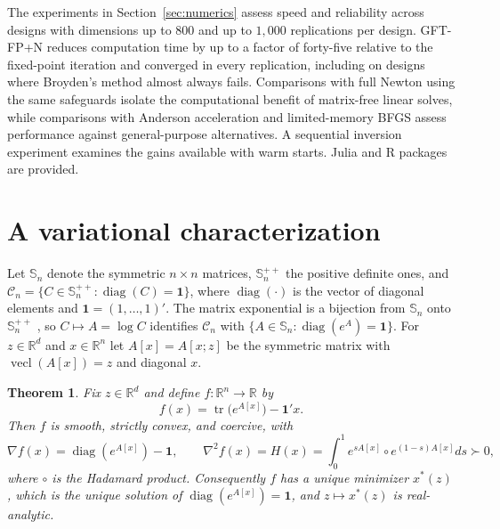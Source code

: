 \documentclass[11pt]{article}
\newcommand{\R}{\mathbb{R}}
\newcommand{\tr}{\operatorname{tr}}
\newcommand{\diag}{\operatorname{diag}}
\newcommand{\vecl}{\operatorname{vecl}}
\newcommand{\one}{\mathbf{1}}
\newcommand{\Sym}{\mathbb{S}_n}
\newcommand{\SPD}{\mathbb{S}_n^{++}}
\newcommand{\Cn}{\mathcal{C}_n}
\newtheorem{theorem}{Theorem}
\begin{document}
The experiments in Section~\ref{sec:numerics} assess speed and reliability across designs with dimensions up to $800$ and up to $1{,}000$ replications per design. GFT-FP+N reduces computation time by up to a factor of forty-five relative to the fixed-point iteration and converged in every replication, including on designs where Broyden's method almost always fails. Comparisons with full Newton using the same safeguards isolate the computational benefit of matrix-free linear solves, while comparisons with Anderson acceleration and limited-memory BFGS assess performance against general-purpose alternatives. A sequential inversion experiment examines the gains available with warm starts. Julia and R packages are provided.

\section{A variational characterization}\label{sec:var}

Let $\Sym$ denote the symmetric $n\times n$ matrices, $\SPD$ the
positive definite ones, and $\Cn=\{C\in\SPD:\diag(C)=\one\}$, where
$\diag(\cdot)$ is the vector of diagonal elements and
$\one=(1,\ldots,1)'$. The matrix exponential is a bijection from $\Sym$
onto $\SPD$ \citep[Ch.~11]{Higham:2008}, so $C\mapsto A=\log C$
identifies $\Cn$ with $\{A\in\Sym:\diag(e^{A})=\one\}$. For $z\in\R^{d}$
and $x\in\R^{n}$ let $A[x]=A[x;z]$ be the symmetric matrix with
$\vecl(A[x])=z$ and diagonal $x$.

\begin{theorem}\label{thm:var}
Fix $z\in\R^{d}$ and define $f:\R^{n}\to\R$ by
\begin{equation}\label{eq:f}
f(x)=\tr\big(e^{A[x]}\big)-\one'x .
\end{equation}
Then $f$ is smooth, strictly convex, and coercive, with
\[
\nabla f(x)=\diag(e^{A[x]})-\one,
\qquad
\nabla^{2}f(x)=H(x)=\int_{0}^{1}e^{sA[x]}\circ e^{(1-s)A[x]}ds\succ0,
\]
where $\circ$ is the Hadamard product. Consequently $f$ has a unique
minimizer $x^{\ast}(z)$, which is the unique solution of
$\diag(e^{A[x]})=\one$, and $z\mapsto x^{\ast}(z)$ is real-analytic.
\end{theorem}
\end{document}
